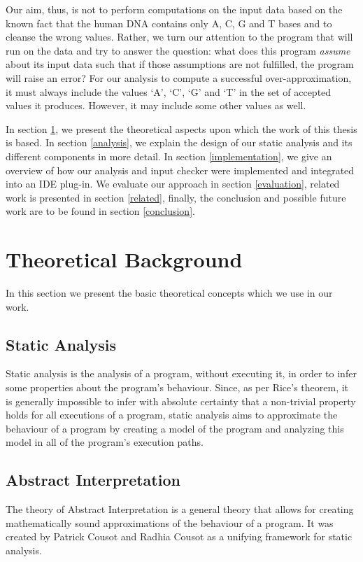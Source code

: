 \documentclass[10pt]{report}
\begin{document}
Our aim, thus, is not to perform computations on the input data based on the known fact that the human DNA contains only A, C, G and T bases and to cleanse the wrong values. Rather, we turn our attention to the program that will run on the data and try to answer the question: what does this program \textit{assume} about its input data such that if those assumptions are not fulfilled, the program will raise an error? For our analysis to compute a successful over-approximation, it must always include the values `A', `C', `G' and `T' in the set of accepted values it produces. However, it may include some other values as well. 

In section \ref{theoretical}, we present the theoretical aspects upon which the work of this thesis is based. In section \ref{analysis}, we explain the design of our static analysis and its different components in more detail. In section \ref{implementation}, we give an overview of how our analysis and input checker were implemented and integrated into an IDE plug-in. We evaluate our approach in section \ref{evaluation}, related work is presented in section \ref{related}, finally, the conclusion and possible future work are to be found in section \ref{conclusion}. 

\section{Theoretical Background} \label{theoretical}

In this section we present the basic theoretical concepts which we use in our work. 

\subsection{Static Analysis}
Static analysis is the analysis of a program, without executing it, in order to infer some properties about the program's behaviour. Since, as per Rice's theorem, it is generally impossible to infer with absolute certainty that a non-trivial property holds for all executions of a program, static analysis aims to approximate the behaviour of a program by creating a model of the program and analyzing this model in all of the program's execution paths.  

\subsection{Abstract Interpretation}
The theory of Abstract Interpretation \cite{cousot} is a general theory that allows for creating mathematically sound approximations of the behaviour of a program. It was created by Patrick Cousot and Radhia Cousot as a unifying framework for static analysis.  
\end{document}
